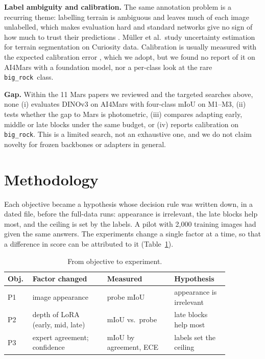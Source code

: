\documentclass[conference]{IEEEtran}
\newcommand{\bigrock}{\texttt{big\_rock}}
\begin{document}
\textbf{Label ambiguity and calibration.} The same annotation problem is a recurring theme: labelling terrain is ambiguous and leaves much of each image unlabelled, which makes evaluation hard and standard networks give no sign of how much to trust their predictions \cite{muller2023uncertainty}. Müller et al.\ study uncertainty estimation for terrain segmentation on Curiosity data. Calibration is usually measured with the expected calibration error \cite{guo2017calibration}, which we adopt, but we found no report of it on AI4Mars with a foundation model, nor a per-class look at the rare \bigrock\ class.

\textbf{Gap.} Within the 11 Mars papers we reviewed and the targeted searches above, none (i) evaluates DINOv3 on AI4Mars with four-class mIoU on M1--M3, (ii) tests whether the gap to Mars is photometric, (iii) compares adapting early, middle or late blocks under the same budget, or (iv) reports calibration on \bigrock. This is a limited search, not an exhaustive one, and we do not claim novelty for frozen backbones or adapters in general.

\section{Methodology}\label{sec:method}
Each objective became a hypothesis whose decision rule was written down, in a dated file, before the full-data runs: appearance is irrelevant, the late blocks help most, and the ceiling is set by the labels. A pilot with 2{,}000 training images had given the same answers. The experiments change a single factor at a time, so that a difference in score can be attributed to it (Table~\ref{tab:design}).
\begin{table}[t]\centering\footnotesize
\caption{From objective to experiment.}\label{tab:design}
\begin{tabular}{@{}p{0.07\linewidth}p{0.30\linewidth}p{0.27\linewidth}p{0.22\linewidth}@{}}\toprule
Obj. & Factor changed & Measured & Hypothesis\\\midrule
P1 & image appearance & probe mIoU & appearance is irrelevant\\
P2 & depth of LoRA (early, mid, late) & mIoU vs.\ probe & late blocks help most\\
P3 & expert agreement; confidence & mIoU by agreement, ECE & labels set the ceiling\\\bottomrule
\end{tabular}\end{table}
\end{document}
